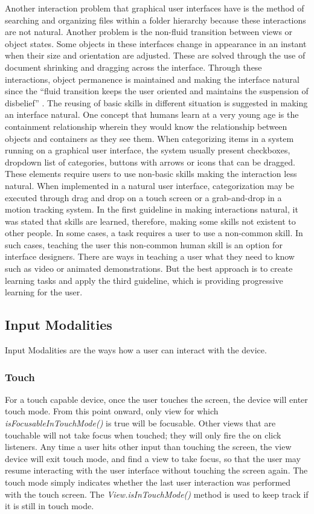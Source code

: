 Another interaction problem that graphical user interfaces have is the method of searching and organizing files within a folder hierarchy because these interactions are not natural. Another problem is the non-fluid transition between views or object states. Some objects in these interfaces change in appearance in an instant when their size and orientation are adjusted. These are solved through the use of document shrinking and dragging across the interface. Through these interactions, object permanence is maintained and making the interface natural since the ``fluid transition keeps the user oriented and maintains the suspension of disbelief'' \cite{blake2011natural}. The reusing of basic skills in different situation is suggested in making an interface natural. One concept that humans learn at a very young age is the containment relationship wherein they would know the relationship between objects and containers as they see them. When categorizing items in a system running on a graphical user interface, the system usually present checkboxes, dropdown list of categories, buttons with arrows or icons that can be dragged. These elements require users to use non-basic skills making the interaction less natural. When implemented in a natural user interface, categorization may be executed through drag and drop on a touch screen or a grab-and-drop in a motion tracking system. In the first guideline in making interactions natural, it was stated that skills are learned, therefore, making some skills not existent to other people. In some cases, a task requires a user to use a non-common skill. In such cases, teaching the user this non-common human skill is an option for interface designers. There are ways in teaching a user what they need to know such as video or animated demonstrations. But the best approach is to create learning tasks and apply the third guideline, which is providing progressive learning for the user.

\subsection{Input Modalities}
\label{sec:inputmodalities}

Input Modalities are the ways how a user can interact with the device.

\subsubsection{Touch}

For a touch capable device, once the user touches the screen, the device will enter touch mode. From this point onward, only view for which \textit{isFocusableInTouchMode()} is true will be focusable. Other views that are touchable will not take focus when touched; they will only fire the on click listeners. Any time a user hits other input than touching the screen, the view device will exit touch mode, and find a view to take focus, so that the user may resume interacting with the user interface without touching the screen again. The touch mode simply indicates whether the last user interaction was performed with the touch screen. The \textit{View.isInTouchMode()} method is used to keep track if it is still in touch mode.

